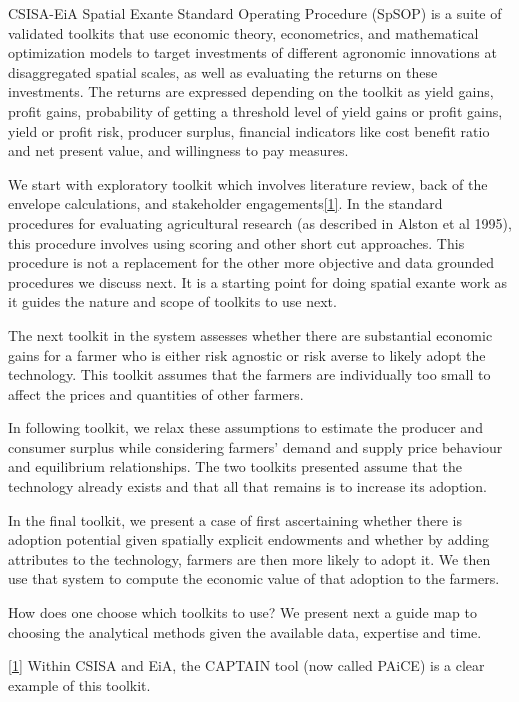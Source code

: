 \documentclass[
  letterpaper,
  DIV=11,
  numbers=noendperiod]{scrreprt}
\begin{document}
CSISA-EiA Spatial Exante Standard Operating Procedure (SpSOP) is a suite
of validated toolkits that use economic theory, econometrics, and
mathematical optimization models to target investments of different
agronomic innovations at disaggregated spatial scales, as well as
evaluating the returns on these investments. The returns are expressed
depending on the toolkit as yield gains, profit gains, probability of
getting a threshold level of yield gains or profit gains, yield or
profit risk, producer surplus, financial indicators like cost benefit
ratio and net present value, and willingness to pay measures. ~~

We start with exploratory toolkit which involves literature review, back
of the envelope calculations, and stakeholder
engagements\hyperref[_ftn1]{{[}1{]}}. In the standard procedures for
evaluating agricultural research (as described in Alston et al 1995),
this procedure involves using scoring and other short cut approaches.
This procedure is not a replacement for the other more objective and
data grounded procedures we discuss next. It is a starting point for
doing spatial exante work as it guides the nature and scope of toolkits
to use next.

The next toolkit in the system assesses whether there are substantial
economic gains for a farmer who is either risk agnostic or risk averse
to likely adopt the technology. This toolkit assumes that the farmers
are individually too small to affect the prices and quantities of other
farmers.

In following toolkit, we relax these assumptions to estimate the
producer and consumer surplus while considering farmers' demand and
supply price behaviour and equilibrium relationships. The two toolkits
presented assume that the technology already exists and that all that
remains is to increase its adoption.

In the final toolkit, we present a case of first ascertaining whether
there is adoption potential given spatially explicit endowments and
whether by adding attributes to the technology, farmers are then more
likely to adopt it. We then use that system to compute the economic
value of that adoption to the farmers.

How does one choose which toolkits to use? We present next a guide map
to choosing the analytical methods given the available data, expertise
and time.

\hyperref[_ftnref1]{{[}1{]}} Within CSISA and EiA, the CAPTAIN tool (now
called PAiCE) is a clear example of this toolkit.
\end{document}
